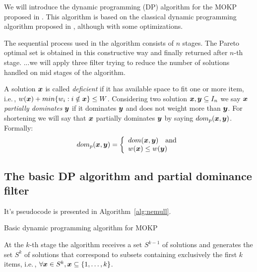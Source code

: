 

We will introduce the dynamic programming (DP) algorithm for the MOKP proposed in \cite{bazgan2009}.
This algorithm is based on the classical dynamic programming algorithm proposed
in \cite{nemhauser1969discrete}, although with some optimizations.

The sequential process used in the algorithm consists of $n$ stages.
The Pareto optimal set is obtained in this constructive way and finally returned after
$n$-th stage.
...we will apply three filter trying to reduce the number of solutions
handled on mid stages of the algorithm.

A solution $\boldsymbol{x}$ is called \emph{deficient} if it has available space
to fit one or more item, i.e.\,, $w(\boldsymbol{x}) + min\{ w_i : i \notin \boldsymbol{x} \} \leq W$.
Considering two solution $\boldsymbol{x}, \boldsymbol{y} \subseteq I_n$ we say
$\boldsymbol{x}$ \emph{partially dominates} $\boldsymbol{y}$ if it dominates $\boldsymbol{y}$ and
does not weight more than $\boldsymbol{y}$.
For shortening we will say that $\boldsymbol{x}$ partially dominates $\boldsymbol{y}$ by saying $dom_p(\boldsymbol{x}, \boldsymbol{y})$.
Formally:
\begin{displaymath}
    dom_p(\boldsymbol{x}, \boldsymbol{y}) = \left\{
      \begin{array}{l}
          dom(\boldsymbol{x}, \boldsymbol{y}) \quad \text{and}\\
          w(\boldsymbol{x}) \leq w(\boldsymbol{y})
  \end{array} \right.
\end{displaymath}

\subsection{The basic DP algorithm and partial dominance filter}

It's pseudocode is presented in Algorithm~\ref{alg:nemull}.
\begin{algorithm}
  \caption{Basic dynamic programming algorithm for MOKP}
  \label{alg:nemull}
  
\end{algorithm}
At the $k$-th stage the algorithm receives a set $S^{k-1}$ of solutions and
generates the set $S^k$ of solutions that correspond
to subsets containing exclusively the first $k$ items, i.e.\,,
$\forall\boldsymbol{x} \in S^k, \boldsymbol{x} \subseteq \{1, \ldots, k\}$.

